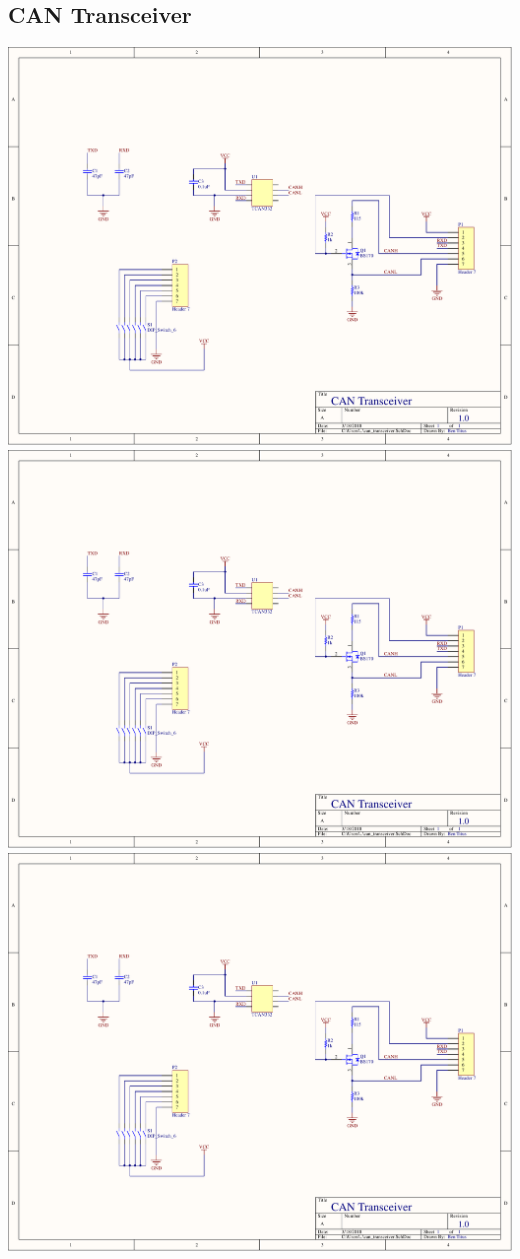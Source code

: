 \begin{flushleft}
\section{CAN Transceiver}
\end{flushleft}
\label{app:can_transceiver}
\centering
\includegraphics[page=1,width=\textwidth,angle=270]{PDFs/can_transceiver.PDF} \newpage
\includegraphics[page=2,width=\textwidth,angle=270]{PDFs/can_transceiver.PDF} \newpage
\includegraphics[page=3,width=\textwidth,angle=270]{PDFs/can_transceiver.PDF} \newpage